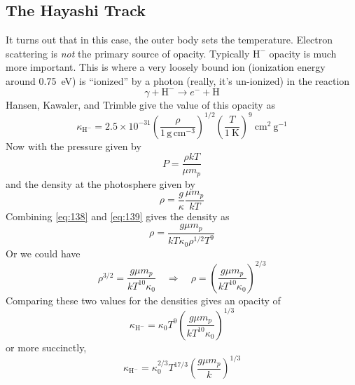 \documentclass[10pt]{article}
\numberwithin{equation}{section}
\newcommand{\n}{\noindent}
\begin{document}
  \subsection{The Hayashi Track}
  \label{sec:fully-conv-stars}
  \n It turns out that in this case, the outer body sets the
  temperature. Electron scattering is \emph{not} the primary source of
  opacity. Typically $\mathrm{H^-}$ opacity is much more
  important. This is where a very loosely bound ion (ionization energy
  around 0.75\ eV) is ``ionized'' by a photon (really, it's un-ionized)
  in the reaction
  \begin{equation}
    \label{eq:136}
    \gamma+\mathrm{H^-}\to e^{-}+\mathrm{H}
  \end{equation}
  Hansen, Kawaler, and Trimble give the value of this opacity as
  \begin{equation}
    \label{eq:137}
    \kappa_{\mathrm{H^-}}=2.5\times 10^{-31}\left(\frac{\rho}{1\,\mathrm{g\,
			cm^{-3}}}\right)^{1/2} \left(\frac{T}{1\ \mathrm{K}}\right)^9\
    \mathrm{cm^2\ g^{-1}}
  \end{equation}
  Now with the pressure given by
  \begin{equation}
    \label{eq:138}
    P=\frac{\rho kT}{\mu m_p}
  \end{equation}
  and the density at the photosphere given by
  \begin{equation}
    \label{eq:139}
    \rho=\frac{g}{\kappa}\frac{\mu m_p}{kT}
  \end{equation}
  Combining \eqref{eq:138} and \eqref{eq:139} gives the density as
  \begin{equation}
    \label{eq:140}
    \rho=\frac{g\mu m_p}{kT \kappa_0 \rho^{1/2}T^9}
  \end{equation}
  Or we could have 
  \begin{equation}
    \label{eq:141}
    \rho^{3/2}=\frac{g\mu m_p}{kT^{10}\kappa_0}\quad\Rightarrow\quad
    \rho=\left(\frac{g\mu m_p}{kT^{10}\kappa_0}\right)^{2/3}
  \end{equation}
  Comparing these two values for the densities gives an opacity of
  \begin{equation}
    \label{eq:142}
    \kappa_{\mathrm{H^-}}=\kappa_0 T^9\left(\frac{g\mu m_p}{k T^
{10}\kappa_0}\right)^{1/3}
  \end{equation}
  or more succinctly,
  \begin{equation}
    \label{eq:143}
    \boxed{
    \kappa_{\mathrm{H^-}}=\kappa_0^{2/3}T^{17/3}\left(\frac{g\mu m_p}{k}
\right)^{1/3}}
  \end{equation}
\end{document}
